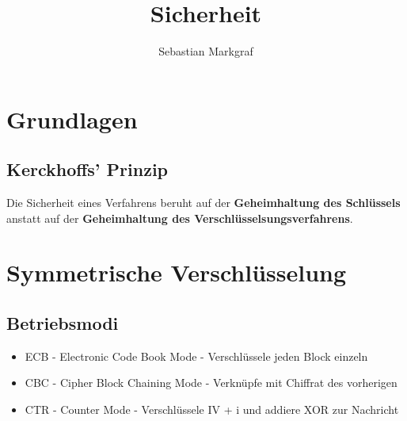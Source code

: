 \documentclass[10pt,a4paper]{article}
\author{Sebastian Markgraf}
\title{Sicherheit}
\begin{document}
	{\let\newpage\relax\maketitle}
	\tableofcontents
	\newpage
	\setcounter{page}{1}

        \section{Grundlagen}
        \subsection{Kerckhoffs' Prinzip}
        Die Sicherheit eines Verfahrens beruht auf der \textbf{Geheimhaltung des Schlüssels}
        anstatt auf der \textbf{Geheimhaltung des Verschlüsselsungsverfahrens}.
        
	\section{Symmetrische Verschlüsselung}
        \subsection{Betriebsmodi}
        \begin{itemize}
        \item ECB - Electronic Code Book Mode - Verschlüssele jeden Block einzeln
        \item CBC - Cipher Block Chaining Mode - Verknüpfe mit Chiffrat des vorherigen
        \item CTR - Counter Mode - Verschlüssele IV + i und addiere XOR zur Nachricht
        \end{itemize}
\end{document}
